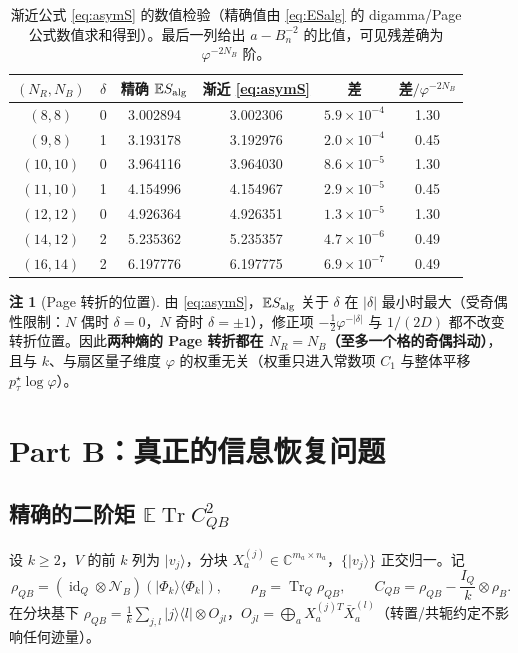 \documentclass[11pt,a4paper]{ctexart}
\theoremstyle{definition}
\newtheorem{remark}{注}
\newcommand{\Tr}{\operatorname{Tr}}
\newcommand{\id}{\operatorname{id}}
\newcommand{\E}{\mathbb{E}}
\newcommand{\C}{\mathbb{C}}
\newcommand{\ph}{\varphi}
\newcommand{\Nalg}{S_{\rm alg}}
\begin{document}
\begin{table}[t]\centering
\caption{渐近公式 \eqref{eq:asymS} 的数值检验（精确值由 \eqref{eq:ESalg} 的 digamma/Page 公式数值求和得到）。最后一列给出 $a-B_n^{-2}$ 的比值，可见残差确为 $\ph^{-2N_B}$ 阶。}
\label{tab:asymA}
\begin{tabular}{cccccc}
\toprule
$(N_R,N_B)$ & $\delta$ & 精确 $\E\Nalg$ & 渐近 \eqref{eq:asymS} & 差 & 差$/\ph^{-2N_B}$\\
\midrule
$(8,8)$ & 0 & 3.002894 & 3.002306 & $5.9\times10^{-4}$ & 1.30\\
$(9,8)$ & 1 & 3.193178 & 3.192976 & $2.0\times10^{-4}$ & 0.45\\
$(10,10)$ & 0 & 3.964116 & 3.964030 & $8.6\times10^{-5}$ & 1.30\\
$(11,10)$ & 1 & 4.154996 & 4.154967 & $2.9\times10^{-5}$ & 0.45\\
$(12,12)$ & 0 & 4.926364 & 4.926351 & $1.3\times10^{-5}$ & 1.30\\
$(14,12)$ & 2 & 5.235362 & 5.235357 & $4.7\times10^{-6}$ & 0.49\\
$(16,14)$ & 2 & 6.197776 & 6.197775 & $6.9\times10^{-7}$ & 0.49\\
\bottomrule
\end{tabular}
\end{table}

\begin{remark}[Page 转折的位置]\label{rem:page}
由 \eqref{eq:asymS}，$\E\Nalg$ 关于 $\delta$ 在 $|\delta|$ 最小时最大（受奇偶性限制：$N$ 偶时 $\delta=0$，$N$ 奇时 $\delta=\pm1$），修正项 $-\frac12\ph^{-|\delta|}$ 与 $1/(2D)$ 都不改变转折位置。因此\textbf{两种熵的 Page 转折都在 $N_R=N_B$（至多一个格的奇偶抖动）}，且与 $k$、与扇区量子维度 $\ph$ 的权重无关（权重只进入常数项 $C_1$ 与整体平移 $p_\tau^\star\log\ph$）。
\end{remark}

\section{Part B：真正的信息恢复问题}
\label{sec:partB}

\subsection{精确的二阶矩 $\E\Tr C_{QB}^2$}

设 $k\ge2$，$V$ 的前 $k$ 列为 $|v_j\rangle$，分块 $X_a^{(j)}\in\C^{m_a\times n_a}$，$\{|v_j\rangle\}$ 正交归一。记
\[
\rho_{QB}=(\id_Q\otimes\mathcal N_B)(|\Phi_k\rangle\langle\Phi_k|),\qquad
\rho_B=\Tr_Q\rho_{QB},\qquad C_{QB}=\rho_{QB}-\frac{I_Q}{k}\otimes\rho_B .
\]
在分块基下 $\rho_{QB}=\frac1k\sum_{j,l}|j\rangle\langle l|\otimes O_{jl}$，$O_{jl}=\bigoplus_a X_a^{(j)T}\bar X_a^{(l)}$（转置/共轭约定不影响任何迹量）。
\end{document}
